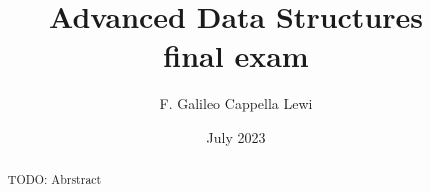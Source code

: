 \documentclass[12pt]{article}
\title{Advanced Data Structures\\\small{final exam}}
\date{July 2023}
\author{F. Galileo Cappella Lewi}
\begin{document}
\maketitle
\begin{abstract}
  TODO: Abrstract
\end{abstract}

\tableofcontents

\newpage

\end{document}
